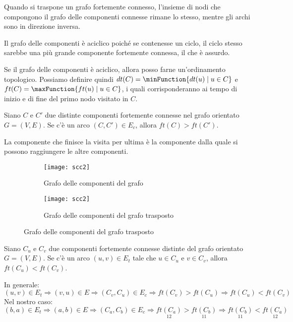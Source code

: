 Quando si traspone un grafo fortemente connesso, l'insieme di nodi che compongono il grafo delle componenti connesse rimane lo stesso, mentre gli archi sono in direzione inversa.

\begin{note}
Il grafo delle componenti è aciclico poiché se contenesse un ciclo, il ciclo stesso sarebbe una più grande componente fortemente connessa, il che è assurdo.
\end{note}

Se il grafo delle componenti è aciclico, allora posso farne un'ordinamento topologico.
Possiamo definire quindi \(dt(C) = \minFunction\{dt(u) \mid u \in C\}\) e \(ft(C) = \maxFunction\{ft(u) \mid u \in C\}\), i quali corrisponderanno ai tempo di inizio e di fine del primo nodo visitato in \(C\).

\begin{theorem*}
Siano \(C\) e \(C'\) due distinte componenti fortemente connesse nel grafo orientato \mbox{\(G = (V,E)\)}.
Se c'è un arco \((C, C') \in E_c\), allora \(ft(C) > ft(C')\).
\end{theorem*}

La componente che finisce la visita per ultima è la componente dalla quale si possono raggiungere le altre componenti.

\begin{figure}[H]
	\begin{subfigure}{.5\textwidth}
		\texttt{[image: scc2]}
		\caption{Grafo delle componenti del grafo}
	\end{subfigure}\hfill
	\begin{subfigure}{.5\textwidth}
		\texttt{[image: scc2]}
		\caption{Grafo delle componenti del grafo trasposto}
	\end{subfigure}
\end{figure}

\begin{corollario*}
Siano \(C_u\) e \(C_v\) due componenti fortemente connesse distinte del grafo orientato \(G = (V,E)\).
Se c'è un arco \((u,v) \in E_t\) tale che \(u \in C_u\) e \(v \in C_v\), allora \(ft(C_u) < ft(C_v)\).
\end{corollario*}

In generale:
\[(u,v) \in E_t \Rightarrow (v,u) \in E \Rightarrow (C_v, C_u) \in E_c \Rightarrow ft(C_v) > ft(C_u) \Rightarrow ft(C_u) < ft(C_v)\]
Nel nostro caso:
\[(b,a) \in E_t \Rightarrow (a,b) \in E \Rightarrow (C_a, C_b) \in E_c \Rightarrow \underset{12}{ft(C_a)} > \underset{11}{ft(C_b)} \Rightarrow \underset{11}{ft(C_b)} < \underset{12}{ft(C_a)}\]

